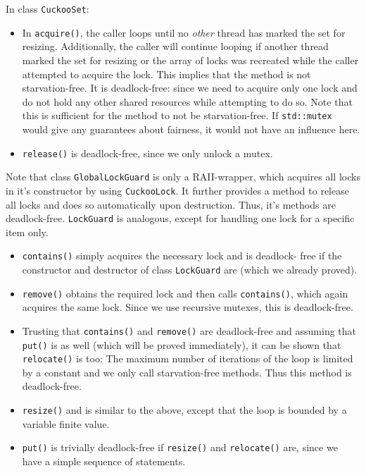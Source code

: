 \documentclass[a4paper,10pt]{article}
\begin{document}
In class \lstinline|CuckooSet|:

\begin{itemize}
\item In \lstinline|acquire()|, the caller loops until no \textit{other} thread
    has marked the set for resizing. Additionally, the caller will continue
    looping if another thread marked the set for resizing or the array of locks
    was recreated while the caller attempted to acquire the lock. This implies
    that the method is not starvation-free. It is deadlock-free: since we need
    to acquire only one lock and do not hold any other shared resources while
    attempting to do so. Note that this is sufficient for the method to not be
    starvation-free. If \lstinline|std::mutex| would  give any guarantees about
    fairness, it would not have an influence here. 

\item \lstinline|release()| is deadlock-free, since we only unlock a mutex.
\end{itemize}

Note that class \lstinline|GlobalLockGuard| is only a RAII-wrapper, which
acquires all locks in it's constructor by using \lstinline|CuckooLock|. It
further provides a method to release all locks and does so automatically upon
destruction. Thus, it's methods are deadlock-free. \lstinline|LockGuard| is
analogous, except for handling one lock for a specific item only. 

\begin{itemize}
\item \lstinline|contains()| simply acquires the necessary lock and is
    deadlock- free if the constructor and destructor of class
    \lstinline|LockGuard| are (which we already proved).

\item \lstinline|remove()| obtains the required lock and then calls
    \lstinline|contains()|, which again acquires the same lock. Since we use
    recursive mutexes, this is deadlock-free. 

\item Trusting that \lstinline|contains()| and \lstinline|remove()| are
    deadlock-free and assuming that \lstinline|put()| is as well (which will be
    proved immediately), it can be shown that \lstinline|relocate()| is too:
    The maximum number of iterations of the loop is limited by a constant and
    we only call starvation-free methods. Thus this method is deadlock-free.

\item \lstinline|resize()| and is similar to the above, except that the loop is
    bounded by a variable finite value.

\item \lstinline|put()| is trivially deadlock-free if \lstinline|resize()| and
    \lstinline|relocate()| are, since we have a simple sequence of statements. 
\end{itemize}
\end{document}
